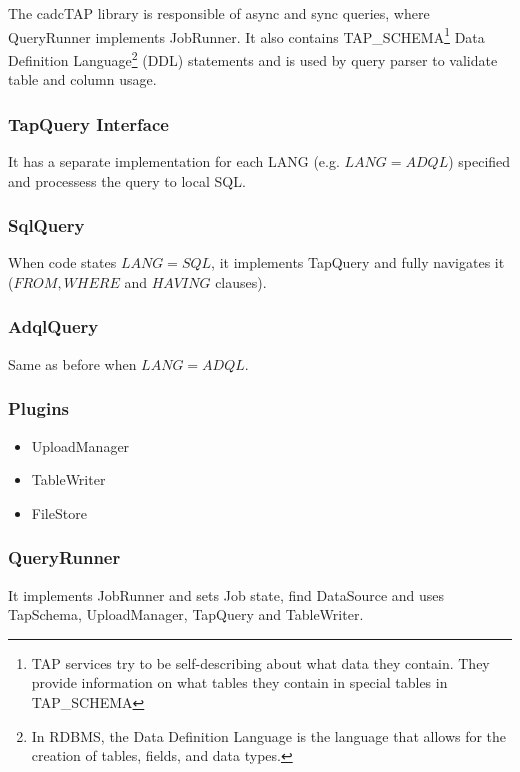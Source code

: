 The cadcTAP library is responsible of async and sync queries, where QueryRunner implements JobRunner. It also contains TAP\_SCHEMA\footnote{TAP services try to be self-describing about what data they contain. They provide information on what tables they contain in special tables in TAP\_SCHEMA}
Data Definition Language\footnote{In RDBMS, the Data Definition Language is the language that allows for the creation of tables, fields, and data types.} (DDL) %
statements and is used by query parser to validate table and column usage.

\subsubsection{TapQuery Interface}

It has a separate implementation for each LANG (e.g. $LANG = ADQL$) specified and processess the query to local SQL.

\subsubsection{SqlQuery}

When code states $LANG=SQL$, it implements TapQuery and fully navigates it ($FROM, WHERE$ and $HAVING$ clauses).

\subsubsection{AdqlQuery}

Same as before when $LANG=ADQL$.

\subsubsection{Plugins}

\begin{itemize}
\item UploadManager
\item TableWriter
\item FileStore
\end{itemize}


\subsubsection{QueryRunner}

It implements JobRunner and sets Job state, find DataSource and uses TapSchema, UploadManager, TapQuery and TableWriter.

